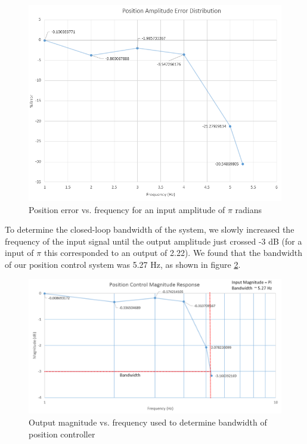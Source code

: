 \documentclass{article}
\theoremstyle{plain}
\theoremstyle{definition}
\theoremstyle{remark}
\begin{document}
\begin{figure}[htb]
\begin{center}
\includegraphics[width = 14cm]{PositionControl_Error.png}
\caption{Position error vs. frequency for an input amplitude of $\pi$ radians}
\label{PosFreqError}
\end{center}
\end{figure}

To determine the closed-loop bandwidth of the system, we slowly increased the frequency of the input signal until the output amplitude just crossed -3 dB (for a input of $\pi$ this corresponded to an output of 2.22). We found that the bandwidth of our position control system was 5.27 Hz, as shown in figure \ref{PosBandwidth}.\\

\begin{figure}[htb]
\begin{center}
\includegraphics[width = 14cm]{PositionControl_Magnitude.png}
\caption{Output magnitude vs. frequency used to determine bandwidth of position controller}
\label{PosBandwidth}
\end{center}
\end{figure}
\end{document}
